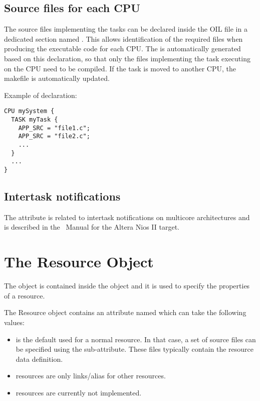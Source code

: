 \subsection{Source files for each CPU}
The source files implementing the tasks can be declared inside the OIL
file in a dedicated section named . This allows identification of the
required files when producing the executable code for each CPU. The
 is automatically generated based on this declaration,
so that only the files implementing the task executing on the CPU need
to be compiled. If the task is moved to another CPU, the makefile is
automatically updated.

Example of declaration:

\begin{lstlisting}
CPU mySystem {
  TASK myTask {
    APP_SRC = "file1.c";
    APP_SRC = "file2.c";
    ...
  }
  ...
}
\end{lstlisting}

\subsection{Intertask notifications}
\label{sec:intertask-notifications}
The attribute  is related to intertask notifications on
multicore architectures and is described in the \ee\ Manual for the
Altera Nios II target.





\section{The Resource Object}

The  object is contained inside the  object
and it is used to specify the properties of a resource.

The Resource object contains an attribute named 
which can take the following values: 
\begin{itemize}
\item {} is the default used for a normal resource. In
  that case, a set of source files can be specified using the
   sub-attribute. These files typically contain the
  resource data definition.
\item {} resources are only links/alias for other
  resources.
\item {} resources are currently not implemented.
\end{itemize}

